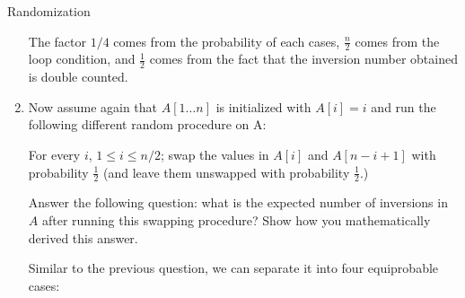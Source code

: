 \documentclass{article}
\begin{document}
\begin{section}{Randomization}
\begin{enumerate}
    The factor $1/4$ comes from the probability of each cases, $\frac{n}{2}$ comes from the loop condition, and $\frac{1}{2}$ comes from the fact that the inversion number obtained is double counted.

    \item Now assume again that $A[1 \dots n]$ is initialized with $A[i] = i$ and run the following different random procedure on A:
    
    For every $i$, $1 \leq i \leq n/2$; swap the values in $A[i]$ and $A[n - i + 1]$ with probability $\frac{1}{2}$ (and leave them unswapped with probability $\frac{1}{2}$.)
    
    Answer the following question:
    what is the expected number of inversions in $A$ after running this swapping procedure? Show how you mathematically derived this answer.
    
    Similar to the previous question, we can separate it into four equiprobable cases:
    

\end{enumerate}
\end{section}
\end{document}
